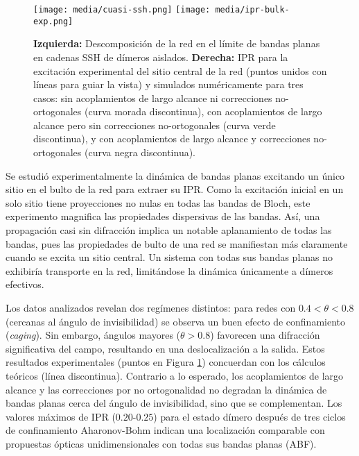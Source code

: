 \begin{figure}[H]
	\centering
	\texttt{[image: media/cuasi-ssh.png]}
	\texttt{[image: media/ipr-bulk-exp.png]}
	\caption[Descomposición de la red en cadenas cuasi-SSH]{  
		\textbf{Izquierda: }  
		Descomposición de la red en el límite de bandas planas en cadenas SSH de dímeros aislados. \textbf{Derecha: }  IPR para la excitación experimental del sitio central de la red (puntos unidos con líneas para guiar la vista) y simulados numéricamente para tres casos: sin acoplamientos de largo alcance ni correcciones no-ortogonales (curva morada discontinua), con acoplamientos de largo alcance pero sin correcciones no-ortogonales (curva verde discontinua), y con acoplamientos de largo alcance y correcciones no-ortogonales (curva negra discontinua).  \label{fig:cuasi-ssh}}
\end{figure} \vspace{-2ex}
Se estudió experimentalmente la dinámica de bandas planas excitando un único sitio en el bulto de la red para extraer su IPR. Como la excitación inicial en un solo sitio tiene proyecciones no nulas en todas las bandas de Bloch, este experimento magnifica las propiedades dispersivas de las bandas. Así, una propagación casi sin difracción implica un notable aplanamiento de todas las bandas, pues las propiedades de bulto de una red se manifiestan más claramente cuando se excita un sitio central. Un sistema con todas sus bandas planas no exhibiría transporte en la red, limitándose la dinámica únicamente a dímeros efectivos.

Los datos analizados revelan dos regímenes distintos: para redes con $0.4 < \theta < 0.8$ (cercanas al ángulo de invisibilidad) se observa un buen efecto de confinamiento (\emph{caging}). Sin embargo, ángulos mayores ($\theta > 0.8$) favorecen una difracción significativa del campo, resultando en una deslocalización a la salida. Estos resultados experimentales (puntos en Figura \ref{fig:cuasi-ssh}) concuerdan con los cálculos teóricos (línea discontinua). Contrario a lo esperado, los acoplamientos de largo alcance y las correcciones por no ortogonalidad no degradan la dinámica de bandas planas cerca del ángulo de invisibilidad, sino que se complementan. Los valores máximos de IPR ($0.20$-$0.25$) para el estado dímero después de tres ciclos de confinamiento Aharonov-Bohm indican una localización comparable con propuestas ópticas unidimensionales con todas sus bandas planas (ABF). 